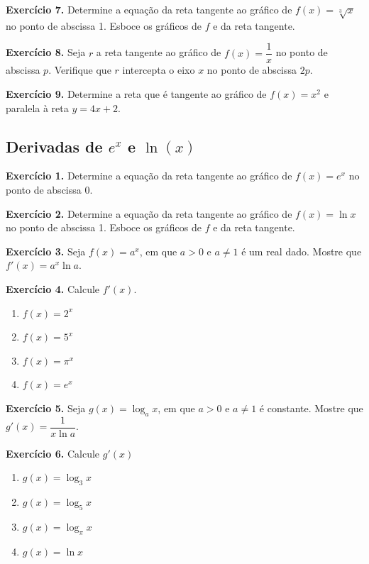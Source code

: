 \documentclass[12pt,a4paper]{article}
\begin{document}
\vspace{0.5cm}
\noindent\textbf{Exercício 7.}
Determine a equação da reta tangente ao gráfico de $f(x) = \sqrt[3]{x}$ no ponto de abscissa 1. Esboce os gráficos de $f$ e da reta tangente.

\vspace{0.5cm}
\noindent\textbf{Exercício 8.}
Seja $r$ a reta tangente ao gráfico de $f(x) = \dfrac{1}{x}$ no ponto de abscissa $p$. Verifique que $r$ intercepta o eixo $x$ no ponto de abscissa $2p$.

\vspace{0.5cm}
\noindent\textbf{Exercício 9.}
Determine a reta que é tangente ao gráfico de $f(x) = x^2$ e paralela à reta $y = 4x + 2$.

\subsection{Derivadas de $e^x$ e $\ln(x)$}
\vspace{0.5cm}
\noindent\textbf{Exercício 1.}
Determine a equação da reta tangente ao gráfico de $f(x) = e^x$ no ponto de abscissa 0.

\vspace{0.5cm}
\noindent\textbf{Exercício 2.}
Determine a equação da reta tangente ao gráfico de $f(x) = \ln x$ no ponto de abscissa 1. Esboce os gráficos de $f$ e da reta tangente.

\vspace{0.5cm}
\noindent\textbf{Exercício 3.}
Seja $f(x) = a^x$, em que $a > 0$ e $a \neq 1$ é um real dado. Mostre que $f'(x) = a^x \ln a$.

\vspace{0.5cm}
\noindent\textbf{Exercício 4.} Calcule $f'(x)$.
\begin{enumerate}
    \renewcommand{\theenumi}{\alph{enumi}}
    \renewcommand{\labelenumi}{\theenumi)}
    \item $f(x) = 2^x$
    \item $f(x) = 5^x$
    \item $f(x) = \pi^x$
    \item $f(x) = e^x$
\end{enumerate}

\vspace{0.5cm}
\noindent\textbf{Exercício 5.}
Seja $g(x) = \log_a x$, em que $a > 0$ e $a \neq 1$ é constante. Mostre que $g'(x) = \dfrac{1}{x \ln a}$.

\vspace{0.5cm}
\noindent\textbf{Exercício 6.} Calcule $g'(x)$
\begin{enumerate}
    \renewcommand{\theenumi}{\alph{enumi}}
    \renewcommand{\labelenumi}{\theenumi)}
    \item $g(x) = \log_3 x$
    \item $g(x) = \log_5 x$
    \item $g(x) = \log_\pi x$
    \item $g(x) = \ln x$
\end{enumerate}
\end{document}
